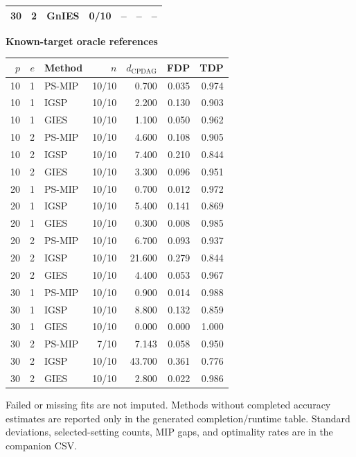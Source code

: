 \begin{table}[t]
\begin{minipage}[t]{0.49\textwidth}
\begin{tabular}{rrlrrrr}
        30 & 2 & GnIES & 0/10 & -- & -- & -- \\
        \hline
    \end{tabular}
    \end{minipage}
    \hfill
    \begin{minipage}[t]{0.49\textwidth}
    \centering
    \textbf{Known-target oracle references}\\[2pt]
    \begin{tabular}{rrlrrrr}
        \hline
        $p$ & $e$ & Method & $n$ & $d_{\mathrm{CPDAG}}$ & FDP & TDP \\
        \hline
        10 & 1 & PS-MIP & 10/10 & 0.700 & 0.035 & 0.974 \\
        10 & 1 & IGSP & 10/10 & 2.200 & 0.130 & 0.903 \\
        10 & 1 & GIES & 10/10 & 1.100 & 0.050 & 0.962 \\
        10 & 2 & PS-MIP & 10/10 & 4.600 & 0.108 & 0.905 \\
        10 & 2 & IGSP & 10/10 & 7.400 & 0.210 & 0.844 \\
        10 & 2 & GIES & 10/10 & 3.300 & 0.096 & 0.951 \\
        20 & 1 & PS-MIP & 10/10 & 0.700 & 0.012 & 0.972 \\
        20 & 1 & IGSP & 10/10 & 5.400 & 0.141 & 0.869 \\
        20 & 1 & GIES & 10/10 & 0.300 & 0.008 & 0.985 \\
        20 & 2 & PS-MIP & 10/10 & 6.700 & 0.093 & 0.937 \\
        20 & 2 & IGSP & 10/10 & 21.600 & 0.279 & 0.844 \\
        20 & 2 & GIES & 10/10 & 4.400 & 0.053 & 0.967 \\
        30 & 1 & PS-MIP & 10/10 & 0.900 & 0.014 & 0.988 \\
        30 & 1 & IGSP & 10/10 & 8.800 & 0.132 & 0.859 \\
        30 & 1 & GIES & 10/10 & 0.000 & 0.000 & 1.000 \\
        30 & 2 & PS-MIP & 7/10 & 7.143 & 0.058 & 0.950 \\
        30 & 2 & IGSP & 10/10 & 43.700 & 0.361 & 0.776 \\
        30 & 2 & GIES & 10/10 & 2.800 & 0.022 & 0.986 \\
        \hline
    \end{tabular}
    \end{minipage}
    \par\smallskip\footnotesize Failed or missing fits are not imputed. Methods without completed accuracy estimates are reported only in the generated completion/runtime table. Standard deviations, selected-setting counts, MIP gaps, and optimality rates are in the companion CSV.
    \endgroup
\end{table}

